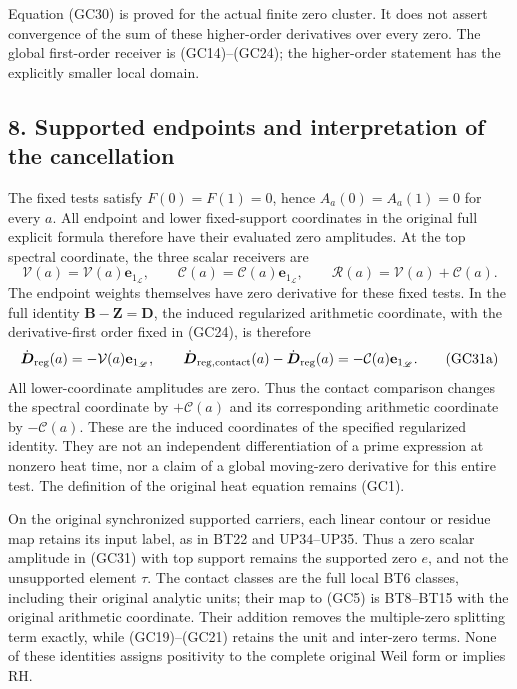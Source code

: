 \documentclass[
  10pt,
  a4paper,
]{article}
\begin{document}
Equation (GC30) is proved for the actual finite zero cluster. It does
not assert convergence of the sum of these higher-order derivatives over
every zero. The global first-order receiver is (GC14)--(GC24); the
higher-order statement has the explicitly smaller local domain.

\subsection{8. Supported endpoints and interpretation of the
cancellation}\label{supported-endpoints-and-interpretation-of-the-cancellation}

The fixed tests satisfy \(F(0)=F(1)=0\), hence \(A_a(0)=A_a(1)=0\) for
every \(a\). All endpoint and lower fixed-support coordinates in the
original full explicit formula therefore have their evaluated zero
amplitudes. At the top spectral coordinate, the three scalar receivers
are \[
\boldsymbol{\mathcal V}(a)=\mathcal V(a)\mathbf e_{1_{\mathscr L}},
\qquad
\boldsymbol{\mathcal C}(a)=\mathcal C(a)\mathbf e_{1_{\mathscr L}},
\qquad
\boldsymbol{\mathcal R}(a)=\boldsymbol{\mathcal V}(a)
+\boldsymbol{\mathcal C}(a).
\tag{GC31}
\] The endpoint weights themselves have zero derivative for these fixed
tests. In the full identity
\(\boldsymbol B-\boldsymbol Z=\boldsymbol D\), the induced regularized
arithmetic coordinate, with the derivative-first order fixed in (GC24),
is therefore \[
\dot{\boldsymbol D}_{\rm reg}(a)
=-\mathcal V(a)\mathbf e_{1_{\mathscr L}},\qquad
\dot{\boldsymbol D}_{\rm reg,contact}(a)
-\dot{\boldsymbol D}_{\rm reg}(a)
=-\mathcal C(a)\mathbf e_{1_{\mathscr L}}.
\tag{GC31a}
\] All lower-coordinate amplitudes are zero. Thus the contact comparison
changes the spectral coordinate by \(+\mathcal C(a)\) and its
corresponding arithmetic coordinate by \(-\mathcal C(a)\). These are the
induced coordinates of the specified regularized identity. They are not
an independent differentiation of a prime expression at nonzero heat
time, nor a claim of a global moving-zero derivative for this entire
test. The definition of the original heat equation remains (GC1).

On the original synchronized supported carriers, each linear contour or
residue map retains its input label, as in BT22 and UP34--UP35. Thus a
zero scalar amplitude in (GC31) with top support remains the supported
zero \(e\), and not the unsupported element \(\tau\). The contact
classes are the full local BT6 classes, including their original
analytic units; their map to (GC5) is BT8--BT15 with the original
arithmetic coordinate. Their addition removes the multiple-zero
splitting term exactly, while (GC19)--(GC21) retains the unit and
inter-zero terms. None of these identities assigns positivity to the
complete original Weil form or implies RH.
\end{document}
